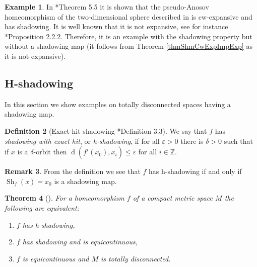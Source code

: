 \documentclass[12pt]{amsart}
\theoremstyle{plain}
\newtheorem{thm}{Theorem}[section]
\theoremstyle{definition}
\newtheorem{rmk}[thm]{Remark}
\newtheorem{exa}[thm]{Example}
\newtheorem{df}[thm]{Definition}
\theoremstyle{remark}
\DeclareMathOperator{\dist}{d}
\DeclareMathOperator{\shm}{Sh}
\newcommand{\Z}{\mathbb Z}
\renewcommand{\epsilon}{\varepsilon}
\newcommand{\rojo}[1]{\textcolor{red}{#1}}
\begin{document}
\begin{exa}
	\label{exaPANoShm}
	In \cite{AAV}*{Theorem 5.5} it is shown that the pseudo-Anosov homeomorphism of the two-dimensional sphere described in \cites{AAV,ArDend} is cw-expansive and has shadowing. It is well known that it is not expansive, see for instance \cite{ArDend}*{Proposition 2.2.2}.
	Therefore, it is an example with the shadowing property but without a shadowing map (it follows from Theorem \ref{thmShmCwExpImpExp} as it is not expansive).
\end{exa}

\subsection{H-shadowing}
\label{secHsh}
In this section we show examples on totally disconnected spaces having a shadowing map.
\begin{df}[Exact hit shadowing \cite{BGOR}*{Definition 3.3}]
	We say that $f$ has \textit{shadowing with exact hit}, or \textit{h-shadowing},
	if for all $\epsilon>0$ there is $\delta>0$ such that
	if $x$ is a $\delta$-orbit then $\dist(f^{i}(x_0),x_i)\leq \epsilon$ for all $i\in\Z$.
\end{df}

\begin{rmk}
	\label{rmkHshImpShm}
	From the definition we see that $f$ has h-shadowing if and only if $\shm_f(x)=x_0$ is a shadowing map.
\end{rmk}

\begin{thm}[\cites{BGO,Kurka}]
	\label{thmBGOh-sh}
	For a homeomorphism $f$ of a compact metric space $M$ the following are equivalent:
	\begin{enumerate}
		\item $f$ has h-shadowing,
		\item $f$ has shadowing and
		is equicontinuous,
		\item $f$ is equicontinuous and $M$ is totally disconnected.
	\end{enumerate}
\end{thm}

%
\end{document}

